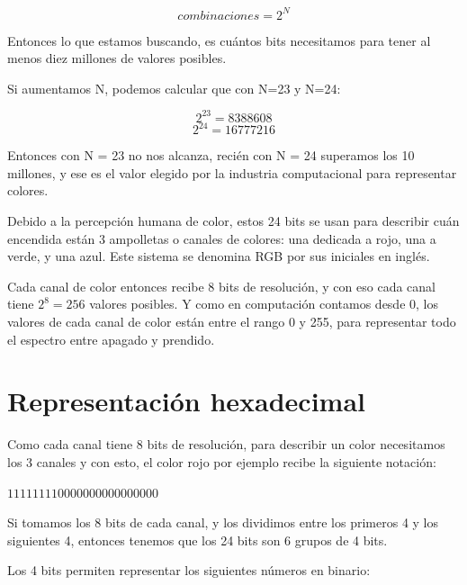 \documentclass[../principal.tex]{subfiles}
\begin{document}
$${combinaciones} = {2}^{N}$$

Entonces lo que estamos buscando, es cuántos bits necesitamos para tener al menos diez millones de valores posibles.

Si aumentamos N, podemos calcular que con N=23 y N=24:

$${2}^{23} = 8388608$$
$${2}^{24} = 16777216$$

Entonces con N = 23 no nos alcanza, recién con N = 24 superamos los 10 millones, y ese es el valor elegido por la industria computacional para representar colores.

Debido a la percepción humana de color, estos 24 bits se usan para describir cuán encendida están 3 ampolletas o canales de colores: una dedicada a rojo, una a verde, y una azul. Este sistema se denomina RGB por sus iniciales en inglés.

Cada canal de color entonces recibe 8 bits de resolución, y con eso cada canal tiene $2^8 = 256$ valores posibles. Y como en computación contamos desde 0, los valores de cada canal de color están entre el rango 0 y 255, para representar todo el espectro entre apagado y prendido.

\section{Representación hexadecimal}

Como cada canal tiene 8 bits de resolución, para describir un color necesitamos los 3 canales y con esto, el color rojo por ejemplo recibe la siguiente notación:

$1111 1111 0000 0000 0000 0000$

Si tomamos los 8 bits de cada canal, y los dividimos entre los primeros 4 y los siguientes 4, entonces tenemos que los 24 bits son 6 grupos de 4 bits.

Los 4 bits permiten representar los siguientes números en binario:
\end{document}
